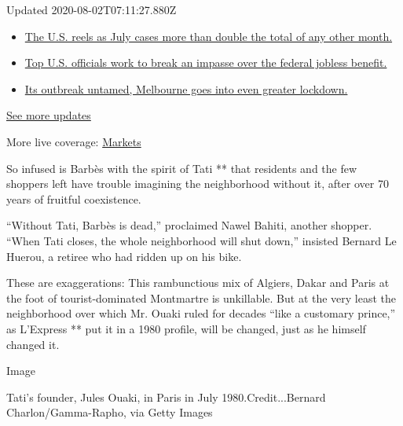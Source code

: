 Updated 2020-08-02T07:11:27.880Z

\begin{itemize}
\tightlist
\item
  \href{https://www.nytimes.com/2020/08/01/world/coronavirus-covid-19.html?action=click\&pgtype=Article\&state=default\&region=MAIN_CONTENT_1\&context=storylines_live_updates\#link-34047410}{The
  U.S. reels as July cases more than double the total of any other
  month.}
\item
  \href{https://www.nytimes.com/2020/08/01/world/coronavirus-covid-19.html?action=click\&pgtype=Article\&state=default\&region=MAIN_CONTENT_1\&context=storylines_live_updates\#link-780ec966}{Top
  U.S. officials work to break an impasse over the federal jobless
  benefit.}
\item
  \href{https://www.nytimes.com/2020/08/01/world/coronavirus-covid-19.html?action=click\&pgtype=Article\&state=default\&region=MAIN_CONTENT_1\&context=storylines_live_updates\#link-2bc8948}{Its
  outbreak untamed, Melbourne goes into even greater lockdown.}
\end{itemize}

\href{https://www.nytimes.com/2020/08/01/world/coronavirus-covid-19.html?action=click\&pgtype=Article\&state=default\&region=MAIN_CONTENT_1\&context=storylines_live_updates}{See
more updates}

More live coverage:
\href{https://www.nytimes.com/live/2020/07/31/business/stock-market-today-coronavirus?action=click\&pgtype=Article\&state=default\&region=MAIN_CONTENT_1\&context=storylines_live_updates}{Markets}

So infused is Barbès with the spirit of Tati ** that residents and the
few shoppers left have trouble imagining the neighborhood without it,
after over 70 years of fruitful coexistence.

``Without Tati, Barbès is dead,'' proclaimed Nawel Bahiti, another
shopper. ``When Tati closes, the whole neighborhood will shut down,''
insisted Bernard Le Huerou, a retiree who had ridden up on his bike.

These are exaggerations: This rambunctious mix of Algiers, Dakar and
Paris at the foot of tourist-dominated Montmartre is unkillable. But at
the very least the neighborhood over which Mr. Ouaki ruled for decades
``like a customary prince,'' as L'Express ** put it in a 1980 profile,
will be changed, just as he himself changed it.

Image

Tati's founder, Jules Ouaki, in Paris in July 1980.Credit...Bernard
Charlon/Gamma-Rapho, via Getty Images

